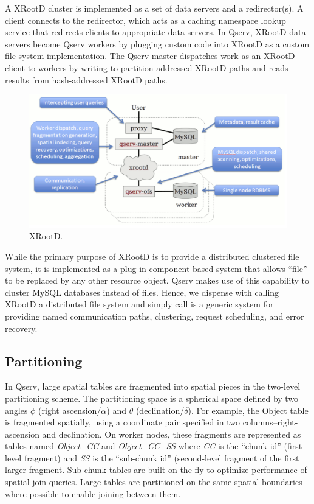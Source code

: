 \documentclass[DM,lsstdraft,toc]{lsstdoc}
\begin{document}
A XRootD cluster is implemented as a set of
data servers and a redirector(s). A client connects to the redirector,
which acts as a caching namespace lookup service that redirects clients
to appropriate data servers. In Qserv, XRootD
data servers become Qserv workers by plugging custom code into
XRootD as a custom file system implementation.
The Qserv master dispatches work as an XRootD
client to workers by writing to partition-addressed
XRootD paths and reads results from
hash-addressed XRootD paths.

\begin{figure}[H]
\centering
\includegraphics{_static/xrootd.png}
\caption{XRootD.}
\end{figure}

While the primary purpose of XRootD is to
provide a distributed clustered file system, it is implemented as a
plug-in component based system that allows ``file'' to be replaced by
any other resource object. Qserv makes use of this capability to cluster
MySQL databases instead of files. Hence, we dispense with calling
XRootD a distributed file system and simply
call is a generic system for providing named communication paths,
clustering, request scheduling, and error recovery.

\subsection{Partitioning}\label{partitioning-1}

In Qserv, large spatial tables are fragmented into spatial pieces in the
two-level partitioning scheme. The partitioning space is a spherical
space defined by two angles $\phi$ (right ascension/$\alpha$) and $\theta$ (declination/$\delta$).
For example, the Object table is fragmented spatially, using a
coordinate pair specified in two columns--right-ascension and
declination. On worker nodes, these fragments are represented as tables
named \emph{Object\_CC} and \emph{Object\_CC\_SS} where \emph{CC} is the
``chunk id'' (first-level fragment) and \emph{SS} is the ``sub-chunk
id'' (second-level fragment of the first larger fragment. Sub-chunk
tables are built on-the-fly to optimize performance of spatial join
queries. Large tables are partitioned on the same spatial boundaries
where possible to enable joining between them.
\end{document}
